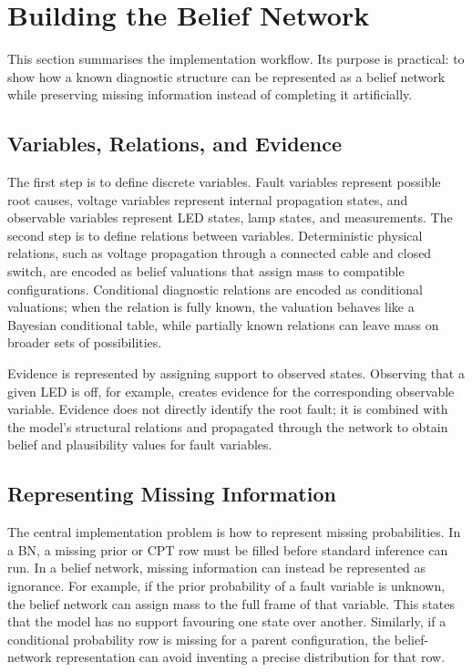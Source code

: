 \documentclass[runningheads]{llncs}
\begin{document}
\section{Building the Belief Network}
\label{sec:building_belief_network}

This section summarises the implementation workflow. Its purpose is practical: to show how a known diagnostic structure can be represented as a belief network while preserving missing information instead of completing it artificially.

\subsection{Variables, Relations, and Evidence}
\label{sec:variables_relations_evidence}

The first step is to define discrete variables. Fault variables represent possible root causes, voltage variables represent internal propagation states, and observable variables represent LED states, lamp states, and measurements. The second step is to define relations between variables. Deterministic physical relations, such as voltage propagation through a connected cable and closed switch, are encoded as belief valuations that assign mass to compatible configurations. Conditional diagnostic relations are encoded as conditional valuations; when the relation is fully known, the valuation behaves like a Bayesian conditional table, while partially known relations can leave mass on broader sets of possibilities.

Evidence is represented by assigning support to observed states. Observing that a given LED is off, for example, creates evidence for the corresponding observable variable. Evidence does not directly identify the root fault; it is combined with the model's structural relations and propagated through the network to obtain belief and plausibility values for fault variables.

\subsection{Representing Missing Information}
\label{sec:representing_missing_information}

The central implementation problem is how to represent missing probabilities. In a BN, a missing prior or CPT row must be filled before standard inference can run. In a belief network, missing information can instead be represented as ignorance. For example, if the prior probability of a fault variable is unknown, the belief network can assign mass to the full frame of that variable. This states that the model has no support favouring one state over another. Similarly, if a conditional probability row is missing for a parent configuration, the belief-network representation can avoid inventing a precise distribution for that row.
\end{document}
